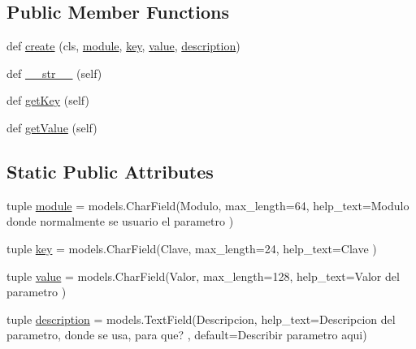 \subsection*{Public Member Functions}
\begin{DoxyCompactItemize}
\item 
def \hyperlink{class_ground_segment_1_1models_1_1_parameter_1_1_parameter_a27550c05a3436bf646f99b9b331ae149}{create} (cls, \hyperlink{class_ground_segment_1_1models_1_1_parameter_1_1_parameter_a880b8fa5882db5b609d5e31c71a12791}{module}, \hyperlink{class_ground_segment_1_1models_1_1_parameter_1_1_parameter_adb452d16d2b26aa423a928b243cf8a18}{key}, \hyperlink{class_ground_segment_1_1models_1_1_parameter_1_1_parameter_a7186899b0882d6b4134ca24ed6f2bbc8}{value}, \hyperlink{class_ground_segment_1_1models_1_1_parameter_1_1_parameter_a685979e7244995a427107dcd31ce55ff}{description})
\item 
def \hyperlink{class_ground_segment_1_1models_1_1_parameter_1_1_parameter_a98a8c7d5a16cb7e6bf0148b39dbe2bfe}{\+\_\+\+\_\+str\+\_\+\+\_\+} (self)
\item 
def \hyperlink{class_ground_segment_1_1models_1_1_parameter_1_1_parameter_a435572aa3457b11e8aa00a7efa0dc7e9}{get\+Key} (self)
\item 
def \hyperlink{class_ground_segment_1_1models_1_1_parameter_1_1_parameter_a83a53921b96c1db22b502f6a25d1a295}{get\+Value} (self)
\end{DoxyCompactItemize}
\subsection*{Static Public Attributes}
\begin{DoxyCompactItemize}
\item 
tuple \hyperlink{class_ground_segment_1_1models_1_1_parameter_1_1_parameter_a880b8fa5882db5b609d5e31c71a12791}{module} = models.\+Char\+Field(\textquotesingle{}Modulo\textquotesingle{}, max\+\_\+length=64, help\+\_\+text=\textquotesingle{}Modulo donde normalmente se usuario el parametro\textquotesingle{} )
\item 
tuple \hyperlink{class_ground_segment_1_1models_1_1_parameter_1_1_parameter_adb452d16d2b26aa423a928b243cf8a18}{key} = models.\+Char\+Field(\textquotesingle{}Clave\textquotesingle{}, max\+\_\+length=24, help\+\_\+text=\textquotesingle{}Clave\textquotesingle{} )
\item 
tuple \hyperlink{class_ground_segment_1_1models_1_1_parameter_1_1_parameter_a7186899b0882d6b4134ca24ed6f2bbc8}{value} = models.\+Char\+Field(\textquotesingle{}Valor\textquotesingle{}, max\+\_\+length=128, help\+\_\+text=\textquotesingle{}Valor del parametro\textquotesingle{} )
\item 
tuple \hyperlink{class_ground_segment_1_1models_1_1_parameter_1_1_parameter_a685979e7244995a427107dcd31ce55ff}{description} = models.\+Text\+Field(\textquotesingle{}Descripcion\textquotesingle{}, help\+\_\+text=\textquotesingle{}Descripcion del parametro, donde se usa, para que?\textquotesingle{} , default=\textquotesingle{}Describir parametro aqui\textquotesingle{})
\end{DoxyCompactItemize}


